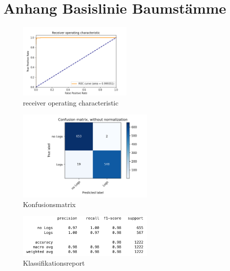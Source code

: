 \chapter{Anhang Basislinie Baumstämme}
\label{appendix:BaseLineLogs}

\begin{figure}[h]
	\centering
	\includegraphics[width=0.5\textwidth, center]{bilder/Anhang/Baseline/Logs/Logs_validation/Logs_Baseline_ROC.png}
	\caption[Baumstammklassifikation Basislinie ROC]{receiver operating characteristic}
	\label{img:BaselineLogsROC}
\end{figure}	

\begin{figure}[h]
	\centering
	\includegraphics[width=0.6\textwidth, center]{bilder/Anhang/Baseline/Logs/Logs_validation/Logs_Baseline_Confusion_Matrix.png}
	\caption[Konfusionsmatrix Baumstammklassifikation Basislinie]{Konfusionsmatrix}
	\label{img:BaselineLogsConfusionMatrix}
\end{figure}	

\begin{figure}[h]
	\centering
	\includegraphics[width=0.6\textwidth, center]{bilder/Anhang/Baseline/Logs/Logs_validation/classification_report.png}
	\caption[Klassifikationsreport Baumstammklassifikation Basislinie]{Klassifikationsreport}
	\label{img:BaselineLogsKlassifikationsreport}
\end{figure}	
